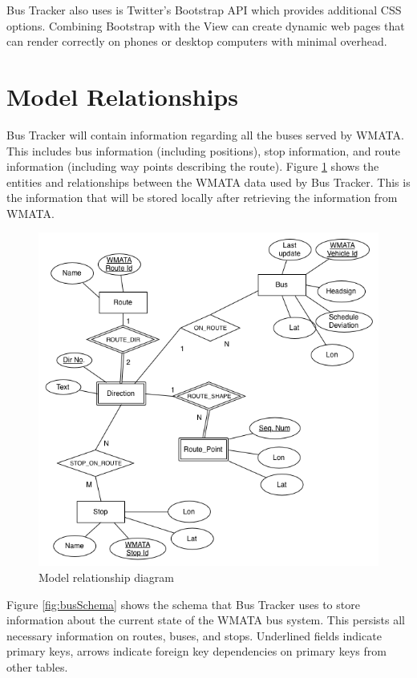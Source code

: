 \documentclass[12pt]{report}
\begin{document}
 Bus Tracker also uses is Twitter's Bootstrap API which provides additional CSS options. Combining Bootstrap with the View can create dynamic web pages that can render correctly on phones or desktop computers with minimal overhead.

\section{Model Relationships}

Bus Tracker will contain information regarding all the buses served by WMATA.  This includes bus information (including positions), stop information, and route information (including way points describing the route).  Figure \ref{fig:busEntity} shows the entities and relationships between the WMATA data used by Bus Tracker.  This is the information that will be stored locally after retrieving the information from WMATA.

\begin{figure}[ht]
  \centerline{\includegraphics[scale=0.43]{bus-entity-rel.png}}
  \caption{Model relationship diagram}
  \label{fig:busEntity}
\end{figure}

Figure \ref{fig:busSchema} shows the schema that Bus Tracker uses to store information about the current state of the WMATA bus system.  This persists all necessary information on routes, buses, and stops.  Underlined fields indicate primary keys, arrows indicate foreign key dependencies on primary keys from other tables.  
\end{document}
